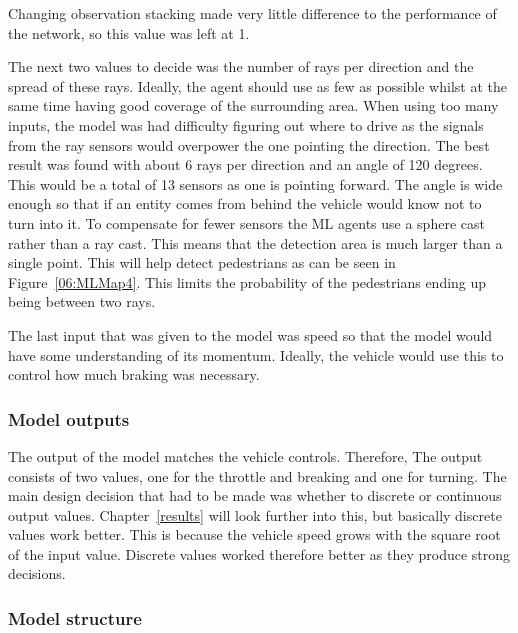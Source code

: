 Changing observation stacking made very little difference to the performance of the network, so this value was left at 1.

The next two values to decide was the number of rays per direction and the spread of these rays. Ideally, the agent should use as few as possible whilst at the same time having good coverage of the surrounding area. When using too many inputs, the model was had difficulty figuring out where to drive as the signals from the ray sensors would overpower the one pointing the direction. The best result was found with about 6 rays per direction and an angle of 120 degrees. This would be a total of 13 sensors as one is pointing forward. The angle is wide enough so that if an entity comes from behind the vehicle would know not to turn into it. To compensate for fewer sensors the ML agents use a sphere cast rather than a ray cast. This means that the detection area is much larger than a single point. This will help detect pedestrians as can be seen in Figure~\ref{06:MLMap4}. This limits the probability of the pedestrians ending up being between two rays.  

The last input that was given to the model was speed so that the model would have some understanding of its momentum. Ideally, the vehicle would use this to control how much braking was necessary. 

\subsubsection{Model outputs}
The output of the model matches the vehicle controls. Therefore, The output consists of two values, one for the throttle and breaking and one for turning. The main design decision that had to be made was whether to discrete or continuous output values. Chapter~\ref{results} will look further into this, but basically discrete values work better. This is because the vehicle speed grows with the square root of the input value. Discrete values worked therefore better as they produce strong decisions. 


\subsubsection{Model structure}



